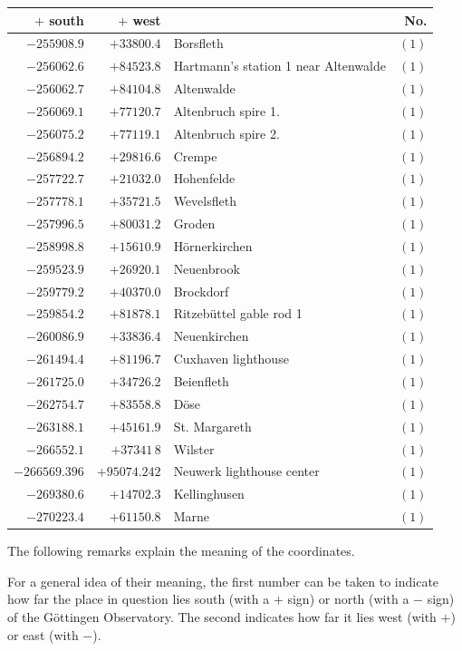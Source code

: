 \begin{center}\begingroup\fontsize{8}{9}\selectfont
\setlength{\tabcolsep}{4pt}
\begin{tabular}{r|r|p{170pt}|r}\hline
\(+\) south&\(+\) west&&No.\\\hline
\(-255908.9\)&\(+33800.4\)&Borsfleth&\((1)\)\\
\(-256062.6\)&\(+84523.8\)&Hartmann’s station 1 near Altenwalde&\((1)\)\\
\(-256062.7\)&\(+84104.8\)&Altenwalde&\((1)\)\\
\(-256069.1\)&\(+77120.7\)&Altenbruch spire 1.&\((1)\)\\
\(-256075.2\)&\(+77119.1\)&Altenbruch spire 2.&\((1)\)\\
\(-256894.2\)&\(+29816.6\)&Crempe&\((1)\)\\
\(-257722.7\)&\(+21032.0\)&Hohenfelde&\((1)\)\\
\(-257778.1\)&\(+35721.5\)&Wevelsfleth&\((1)\)\\
\(-257996.5\)&\(+80031.2\)&Groden&\((1)\)\\
\(-258998.8\)&\(+15610.9\)&Hörnerkirchen&\((1)\)\\
\(-259523.9\)&\(+26920.1\)&Neuenbrook&\((1)\)\\
\(-259779.2\)&\(+40370.0\)&Brockdorf&\((1)\)\\
\(-259854.2\)&\(+81878.1\)&Ritzebüttel gable rod 1&\((1)\)\\
\(-260086.9\)&\(+33836.4\)&Neuenkirchen&\((1)\)\\
\(-261494.4\)&\(+81196.7\)&Cuxhaven lighthouse&\((1)\)\\
\(-261725.0\)&\(+34726.2\)&Beienfleth&\((1)\)\\
\(-262754.7\)&\(+83558.8\)&Döse&\((1)\)\\
\(-263188.1\)&\(+45161.9\)&St. Margareth&\((1)\)\\
\(-266552.1\)&\(+37341\,8\)&Wilster&\((1)\)\\
\(-266569.396\)&\(+95074.242\)&Neuwerk lighthouse center&\((1)\)\\
\(-269380.6\)&\(+14702.3\)&Kellinghusen&\((1)\)\\
\(-270223.4\)&\(+61150.8\)&Marne&\((1)\)\\
\hline\end{tabular}\endgroup\end{center}

The following remarks explain the meaning of the coordinates.

For a general idea of their meaning, the first number can be taken to indicate how far the place in question lies south (with a \(+\) sign) or north (with a \(-\) sign) of the Göttingen Observatory. The second indicates how far it lies west (with \(+\)) or east (with \(-\)).

